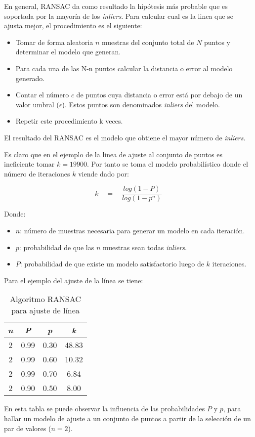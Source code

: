 En general, RANSAC da como resultado la hipótesis más probable que es soportada por la mayoría de los \textit{inliers}. Para calcular cual es la linea que se ajusta mejor, el procedimiento es el siguiente:

\begin{itemize}
\item Tomar de forma aleatoria $n$ muestras del conjunto total de $N$ puntos  y determinar el modelo que generan.
\item  Para cada una de las N-n puntos calcular la distancia o error al modelo generado.
\item Contar el número $c$ de puntos cuya distancia o error está por debajo de un valor umbral ($\epsilon$). Estos puntos son denominados \textit{inliers} del modelo.
\item Repetir este procedimiento k veces.
\end{itemize}

El resultado del RANSAC es el modelo que obtiene el mayor número de \textit{inliers}.

Es claro que en el ejemplo de la linea de ajuste al conjunto de puntos es ineficiente tomar $k= 19900$. Por tanto se toma el modelo probabilístico donde el número de iteraciones $k$ viende dado por:

\begin{equation}
k\quad =\quad \frac { log(1-P) }{ log(1-{ p }^{ n }) } 
\end{equation}

Donde:
\begin{itemize}
\item $n$: número de muestras necesaria para generar un modelo en cada iteración.
\item $p$: probabilidad de que las $n$ muestras sean todas \textit{inliers}.
\item $P$: probabilidad de que existe un modelo satisfactorio luego de $k$ iteraciones.
\end{itemize}

Para el ejemplo del ajuste de la línea se tiene:


\begin{table}[H]
		\centering
	\caption{Algoritmo RANSAC para ajuste de línea}
	\begin{tabular}{|c|c|c|c|}
		\hline
		\textbf{\textit{n}} & \textbf{\textit{P}} & \textbf{\textit{p}} & \textbf{\textit{k}} \\ \hline
		2 & 0.99 & 0.30 & 48.83 \\ \hline
		2 & 0.99 & 0.60 & 10.32 \\ \hline
		2 & 0.99 & 0.70 & 6.84 \\ \hline
		2 & 0.90 & 0.50 & 8.00 \\ \hline
	\end{tabular}
	\label{RansacLinea}
\end{table}


En esta tabla se puede observar la influencia de las probabilidades $P$ y $p$, para hallar un modelo de ajuste a un conjunto de puntos a partir de la selección de un par de valores ($n = 2$).


